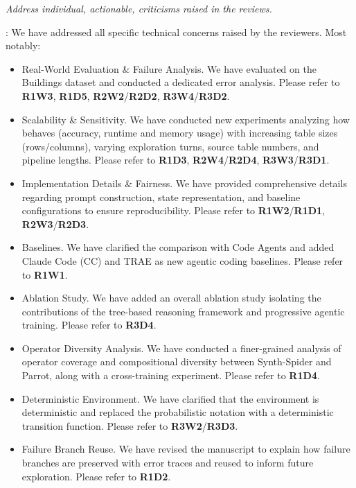 \begin{shaded}
{
\emph{Address individual, actionable, criticisms raised in the reviews.}
}
\end{shaded}

: 
We have addressed all specific technical concerns raised by the reviewers. Most notably:
\begin{itemize}[leftmargin=*]
    \item[(1)] {Real-World Evaluation \& Failure Analysis.} We have evaluated on the Buildings dataset and conducted a dedicated error analysis. Please refer to \textbf{R1W3}, \textbf{R1D5}, \textbf{R2W2}/\textbf{R2D2}, \textbf{R3W4}/\textbf{R3D2}.
    \item[(2)] {Scalability \& Sensitivity.} We have conducted new experiments analyzing how \sys behaves (accuracy, runtime and memory usage) with increasing table sizes (rows/columns), varying exploration turns, source table numbers, and pipeline lengths. Please refer to \textbf{R1D3}, \textbf{R2W4}/\textbf{R2D4}, \textbf{R3W3}/\textbf{R3D1}.
    \item[(3)] {Implementation Details \& Fairness.} We have provided comprehensive details regarding prompt construction, state representation, and baseline configurations to ensure reproducibility. Please refer to \textbf{R1W2}/\textbf{R1D1}, \textbf{R2W3}/\textbf{R2D3}.
    \item[(4)] {Baselines.} We have clarified the comparison with Code Agents and added Claude Code (CC) and TRAE as new agentic coding baselines. Please refer to \textbf{R1W1}.
    \item[(5)] {Ablation Study.} We have added an overall ablation study isolating the contributions of the tree-based reasoning framework and progressive agentic training. Please refer to \textbf{R3D4}.
    \item[(6)] {Operator Diversity Analysis.} We have conducted a finer-grained analysis of operator coverage and compositional diversity between Synth-Spider and Parrot, along with a cross-training experiment. Please refer to \textbf{R1D4}.
    \item[(7)] {Deterministic Environment.} We have clarified that the environment is deterministic and replaced the probabilistic notation with a deterministic transition function. Please refer to \textbf{R3W2}/\textbf{R3D3}.
    \item[(8)] {Failure Branch Reuse.} We have revised the manuscript to explain how failure branches are preserved with error traces and reused to inform future exploration. Please refer to \textbf{R1D2}.
\end{itemize}
